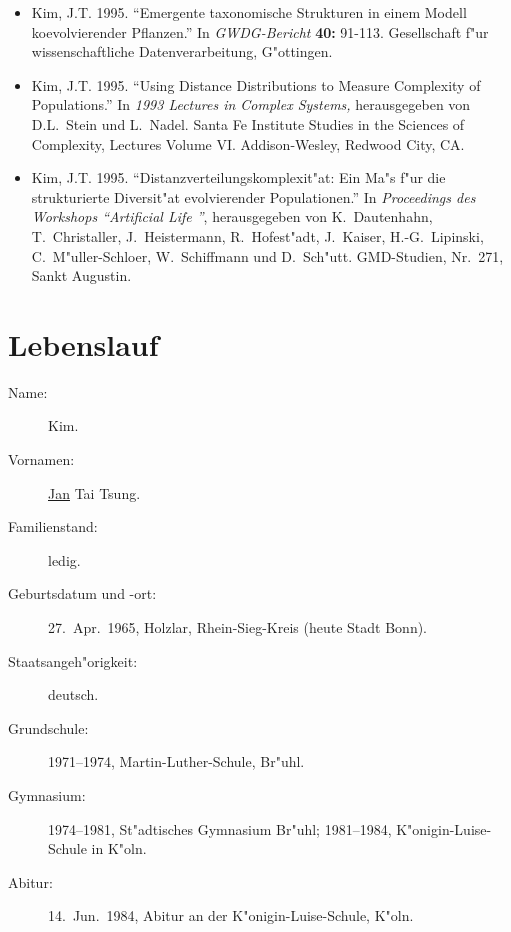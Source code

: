 \begin{appendix}
\begin{itemize}
\item Kim, J.T. 1995. "`Emergente taxonomische Strukturen in einem Modell koevolvierender Pflanzen."'
    In \textsl{GWDG-Bericht} \textbf{40:} 91-113. Gesellschaft f"ur wissenschaftliche Datenverarbeitung, G"ottingen.

\item Kim, J.T. 1995. "`Using Distance Distributions to Measure Complexity of Populations."'
    In \textsl{1993 Lectures in Complex Systems,} herausgegeben von D.L.\ Stein und L.\ Nadel.
    Santa Fe Institute Studies in the Sciences of Complexity, Lectures Volume VI.
    Addison-Wesley, Redwood City, CA.

\item Kim, J.T. 1995. "`Distanzverteilungskomplexit"at: Ein Ma"s f"ur die strukturierte Diversit"at
    evolvierender Populationen."' In \textsl{Proceedings des Workshops "`Artificial Life "'},
    herausgegeben von K.\ Dautenhahn, T.\ Christaller, J.\ Heistermann, R.\ Hofest"adt, J.\ Kaiser,
    H.-G.\ Lipinski, C.\ M"uller-Schloer, W.\ Schiffmann und D.\ Sch"utt. GMD-Studien, Nr.\ 271, Sankt Augustin.

\end{itemize}


\chapter{Lebenslauf}

\begin{description}

\item[Name:] Kim.

\item[Vornamen:] \underline{Jan} Tai Tsung.

\item[Familienstand:] ledig.

\item[Geburtsdatum und -ort:] 27.\ Apr.\ 1965, Holzlar, Rhein-Sieg-Kreis (heute Stadt Bonn).

\item[Staatsangeh"origkeit:] deutsch.

\item[Grundschule:] 1971--1974, Martin-Luther-Schule, Br"uhl.

\item[Gymnasium:] 1974--1981, St"adtisches Gymnasium Br"uhl;
    1981--1984, K"onigin-Luise-Schule in K"oln.

\item[Abitur:] 14.\ Jun.\ 1984, Abitur an der K"onigin-Luise-Schule, K"oln.


\end{description}
\end{appendix}

